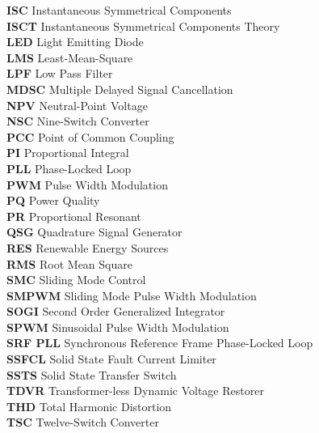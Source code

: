 \begin{tabbing}
\textbf{ISC}  \>  Instantaneous Symmetrical Components						\\
\textbf{ISCT}  \>  Instantaneous Symmetrical Components	Theory					\\

\textbf{LED}  \> Light Emitting Diode						\\
\textbf{LMS}  \> Least-Mean-Square						\\
\textbf{LPF}  \> Low Pass Filter						\\

\textbf{MDSC}  \> Multiple Delayed Signal Cancellation						\\

\textbf{NPV}  \> 	Neutral-Point Voltage					\\
\textbf{NSC}  \> 	Nine-Switch Converter					\\

\textbf{PCC}  \> Point of Common Coupling						\\
\textbf{PI}   \> Proportional Integral 					\\
\textbf{PLL}  \> Phase-Locked Loop 						\\
\textbf{PWM}  \> Pulse Width Modulation 					\\
\textbf{PQ}  \> Power Quality						\\
\textbf{PR}  \> Proportional Resonant						\\

\textbf{QSG}  \>  Quadrature Signal Generator						\\

\textbf{RES}  \> Renewable Energy Sources						\\
\textbf{RMS}  \> Root Mean Square						\\

\textbf{SMC}  \> Sliding Mode Control						\\
\textbf{SMPWM}  \> Sliding Mode Pulse Width Modulation 					\\
\textbf{SOGI}  \> Second Order Generalized Integrator						\\
\textbf{SPWM}  \> Sinusoidal Pulse Width Modulation 					\\
\textbf{SRF PLL}  \> Synchronous Reference Frame Phase-Locked Loop						\\
\textbf{SSFCL}  \> Solid State Fault Current Limiter						\\
\textbf{SSTS}  \> Solid State Transfer Switch						\\

\textbf{TDVR}  \> Transformer-less Dynamic Voltage Restorer						\\
\textbf{THD}  \>  Total Harmonic Distortion						\\
\textbf{TSC}  \> 	Twelve-Switch Converter					\\


\end{tabbing}
